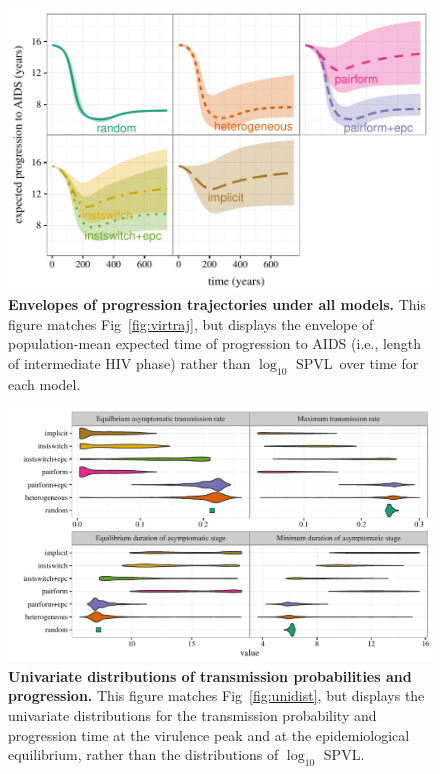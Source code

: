 \documentclass[10pt,letterpaper]{article}
\renewcommand{\figurename}{Fig}
\newcommand{\Lspvl}{$\log_{10}$ SPVL}
\begin{document}
\begin{figure}[!ht]
\includegraphics[width=\textwidth]{../figures/fig_S2_2.pdf}
\caption{{\bf Envelopes of progression trajectories under all models.}
This figure matches \figurename~\ref{fig:virtraj}, but displays the
envelope of population-mean expected time of progression to AIDS (i.e., length of
intermediate HIV phase) rather than \Lspvl\ over time
for each model.
}
\label{fig:durtraj}
\end{figure}

\begin{figure}[!ht]
  \includegraphics[width=\textwidth]{../figures/fig_S2_3.pdf}
\caption{{\bf Univariate distributions of transmission probabilities and progression.}
This figure matches \figurename~\ref{fig:unidist}, but displays the
univariate distributions for the transmission probability and 
progression time at the virulence
peak and at the epidemiological equilibrium,
rather than the distributions of \Lspvl.
}
\label{fig:tranprogsum}
\end{figure}

\clearpage

\nolinenumbers

%
%
% 


\end{document}
